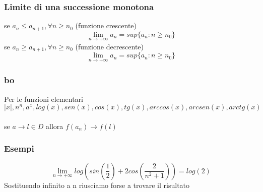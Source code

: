 \documentclass{article}
\begin{document}
\begin{flushleft}
\begin{flushleft}
                \subsubsection{Limite di una successione monotona}
                \begin{flushleft}
                    se $a_n \leq a_{n+1}, \forall n \geq n_0$ (funzione crescente)
                    \begin{equation}
                        \lim_{n\to+\infty} a_n=sup\{a_n:n\geq n_0\}
                    \end{equation}
                    se $a_n \geq a_{n+1}, \forall n \geq n_0$ (funzione decrescente)
                    \begin{equation}
                        \lim_{n\to+\infty} a_n=sup\{a_n:n\geq n_0\}
                    \end{equation}
                \end{flushleft}
                \subsubsection{bo}
                \begin{flushleft}
                   Per le funzioni elementari
                    \begin{equation}
                        |x|,n^n,a^x,log(x),sen(x),cos(x),tg(x),arccos(x),arcsen(x),arctg(x)
                    \end{equation}
                    \\se $a \to l\in D$ allora $f(a_n)\to f(l)$
                \end{flushleft}
                \subsubsection{Esempi}
                \begin{equation}
                    \lim_{n\to+\infty} log(sin(\frac{1}{2}) + 2cos(\frac{2}{n^2+1})) = log(2)
                \end{equation}
                Sostituendo infinito a n riusciamo forse a trovare il risultato

\end{flushleft}
\end{flushleft}
\end{document}
